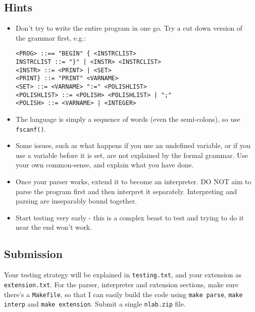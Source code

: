 \begin{exercise}
\subsection*{Hints}
\begin{itemize}
\item Don't try to write the entire program in one go. Try a cut
down version of the grammar first, e.g.:
\begin{verbatim}
<PROG> ::== "BEGIN" { <INSTRCLIST>
INSTRCLIST ::= "}" | <INSTR> <INSTRCLIST>
<INSTR> ::= <PRINT> | <SET>
<PRINT} ::= "PRINT" <VARNAME>
<SET> ::= <VARNAME> ":=" <POLISHLIST>
<POLISHLIST> ::= <POLISH> <POLISHLIST> | ";"
<POLISH> ::= <VARNAME> | <INTEGER>
\end{verbatim}
\item The language is simply a sequence of words (even the semi-colons),
so use \verb^fscanf()^.
\item Some issues, such as what happens if you use an undefined variable,
or if you use a variable before it is set, are not explained by the formal
grammar. Use your own common-sense, and explain what you have done.
\item Once your parser works, extend it to become an interpreter. DO NOT
aim to parse the program first and then interpret it separately. Interpreting
and parsing are inseparably bound together.
\item Start testing very early - this is a complex beast to test and trying to
do it near the end won't work.
\end{itemize}

\subsection*{Submission}
Your testing strategy will be explained in \verb^testing.txt^, and your extension
as \verb^extension.txt^. For the parser, interpreter and extension sections, make
sure there's a \verb^Makefile^, so that I can easily build the code using \verb^make parse^,
\verb^make interp^ and \verb^make extension^. Submit a single \verb^nlab.zip^ file.

\end{exercise}
